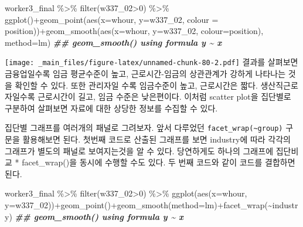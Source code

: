\documentclass[
]{book}
\newenvironment{Shaded}{\begin{snugshade}}{\end{snugshade}}
\newcommand{\AttributeTok}[1]{\textcolor[rgb]{0.77,0.63,0.00}{#1}}
\newcommand{\DecValTok}[1]{\textcolor[rgb]{0.00,0.00,0.81}{#1}}
\newcommand{\DocumentationTok}[1]{\textcolor[rgb]{0.56,0.35,0.01}{\textbf{\textit{#1}}}}
\newcommand{\FunctionTok}[1]{\textcolor[rgb]{0.00,0.00,0.00}{#1}}
\newcommand{\NormalTok}[1]{#1}
\newcommand{\SpecialCharTok}[1]{\textcolor[rgb]{0.00,0.00,0.00}{#1}}
\newcommand{\StringTok}[1]{\textcolor[rgb]{0.31,0.60,0.02}{#1}}
\theoremstyle{definition}
\theoremstyle{definition}
\theoremstyle{definition}
\theoremstyle{definition}
\theoremstyle{remark}
\begin{document}
\begin{Shaded}
\begin{Highlighting}[]

\NormalTok{worker3\_final }\SpecialCharTok{\%\textgreater{}\%} 
  \FunctionTok{filter}\NormalTok{(w337\_02}\SpecialCharTok{\textgreater{}}\DecValTok{0}\NormalTok{) }\SpecialCharTok{\%\textgreater{}\%} 
  \FunctionTok{ggplot}\NormalTok{()}\SpecialCharTok{+}\FunctionTok{geom\_point}\NormalTok{(}\FunctionTok{aes}\NormalTok{(}\AttributeTok{x=}\NormalTok{whour, }\AttributeTok{y=}\NormalTok{w337\_02, }\AttributeTok{colour =}\NormalTok{ position))}\SpecialCharTok{+}\FunctionTok{geom\_smooth}\NormalTok{(}\FunctionTok{aes}\NormalTok{(}\AttributeTok{x=}\NormalTok{whour, }\AttributeTok{y=}\NormalTok{w337\_02, }\AttributeTok{colour=}\NormalTok{position), }\AttributeTok{method=}\StringTok{\textquotesingle{}lm\textquotesingle{}}\NormalTok{)}
\DocumentationTok{\#\# \textasciigrave{}geom\_smooth()\textasciigrave{} using formula \textquotesingle{}y \textasciitilde{} x\textquotesingle{}}
\end{Highlighting}
\end{Shaded}

\texttt{[image: \_main\_files/figure-latex/unnamed-chunk-80-2.pdf]}
결과를 살펴보면 금융업일수록 임금 평균수준이 높고, 근로시간-임금의 상관관계가 강하게 나타나는 것을 확인할 수 있다. 또한 관리자일 수록 임금수준이 높고, 근로시간은 짧다. 생산직근로자일수록 근로시간이 길고, 임금 수준은 낮은편이다. 이처럼 scatter plot을 집단별로 구분하여 살펴보면 자료에 대한 상당한 정보를 수집할 수 있다.

집단별 그래프를 여러개의 패널로 그려보자. 앞서 다루었던 \texttt{facet\_wrap(\textasciitilde{}group)} 구문을 활용해보면 된다. 첫번째 코드로 산출된 그래프를 보면 industry에 따라 각각의 그래프가 별도의 패널로 보여지는것을 알 수 있다. 당연하게도 하나의 그래프에 집단비교 * facet\_wrap()을 동시에 수행할 수도 있다. 두 번째 코드와 같이 코드를 결합하면 된다.

\begin{Shaded}
\begin{Highlighting}[]
\NormalTok{worker3\_final }\SpecialCharTok{\%\textgreater{}\%} 
  \FunctionTok{filter}\NormalTok{(w337\_02}\SpecialCharTok{\textgreater{}}\DecValTok{0}\NormalTok{) }\SpecialCharTok{\%\textgreater{}\%} 
  \FunctionTok{ggplot}\NormalTok{(}\FunctionTok{aes}\NormalTok{(}\AttributeTok{x=}\NormalTok{whour, }\AttributeTok{y=}\NormalTok{w337\_02))}\SpecialCharTok{+}\FunctionTok{geom\_point}\NormalTok{()}\SpecialCharTok{+}\FunctionTok{geom\_smooth}\NormalTok{(}\AttributeTok{method=}\StringTok{\textquotesingle{}lm\textquotesingle{}}\NormalTok{)}\SpecialCharTok{+}\FunctionTok{facet\_wrap}\NormalTok{(}\SpecialCharTok{\textasciitilde{}}\NormalTok{industry)}
\DocumentationTok{\#\# \textasciigrave{}geom\_smooth()\textasciigrave{} using formula \textquotesingle{}y \textasciitilde{} x\textquotesingle{}}
\end{Highlighting}
\end{Shaded}
\end{document}
